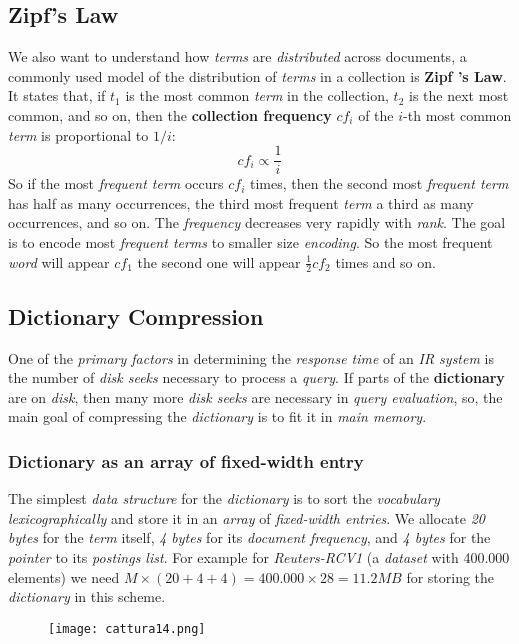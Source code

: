 \documentclass{article}
\begin{document}
\subsection{Zipf's Law}
We also want to understand how \emph{terms} are \emph{distributed} across documents, a commonly used model of the distribution of \emph{terms} in a collection is \textbf{Zipf ’s Law}. It states that, if $t_1$ is the most common \emph{term} in the collection, $t_2$ is the next most common, and so on, then the \textbf{collection frequency} $cf_i$ of the $i$-th most common \emph{term} is proportional to $1/i$:
\[ cf_i \propto \frac{1}{i}\]
So if the most \emph{frequent term} occurs $cf_i$ times, then the second most \emph{frequent term} has half as many occurrences, the third most frequent \emph{term} a third as many occurrences, and so on. The \emph{frequency} decreases very rapidly with \emph{rank}. The goal is to encode most \emph{frequent terms} to smaller size \emph{encoding}. So the most frequent \emph{word} will appear $cf_1$ the second one will appear $\frac{1}{2}cf_2$ times and so on. 
\subsection{Dictionary Compression}
One of the \emph{primary factors} in determining the \emph{response time} of an \emph{IR system} is the number of \emph{disk seeks} necessary to process a \emph{query}. If parts of the \textbf{dictionary} are on \emph{disk}, then many more \emph{disk seeks} are necessary in \emph{query evaluation}, so, the main goal of compressing the \emph{dictionary} is to fit it in \emph{main memory}.\clearpage
\subsubsection{Dictionary as an array of fixed-width entry}
 The simplest \emph{data structure} for the \emph{dictionary} is to sort the \emph{vocabulary lexicographically} and store it in an \emph{array} of \emph{fixed-width entries}. We allocate \emph{20 bytes} for the \emph{term} itself, \emph{4 bytes} for its \emph{document frequency}, and\emph{ 4 bytes} for the \emph{pointer} to its \emph{postings list}. For example for \emph{Reuters-RCV1} (a \emph{dataset} with 400.000 elements) we need $M \times (20 + 4 + 4) = 400.000 \times 28 = 11.2 MB$ for storing the \emph{dictionary} in this scheme. 
\begin{figure}[H]
  \centering
  \texttt{[image: cattura14.png]}
\end{figure}
\end{document}
